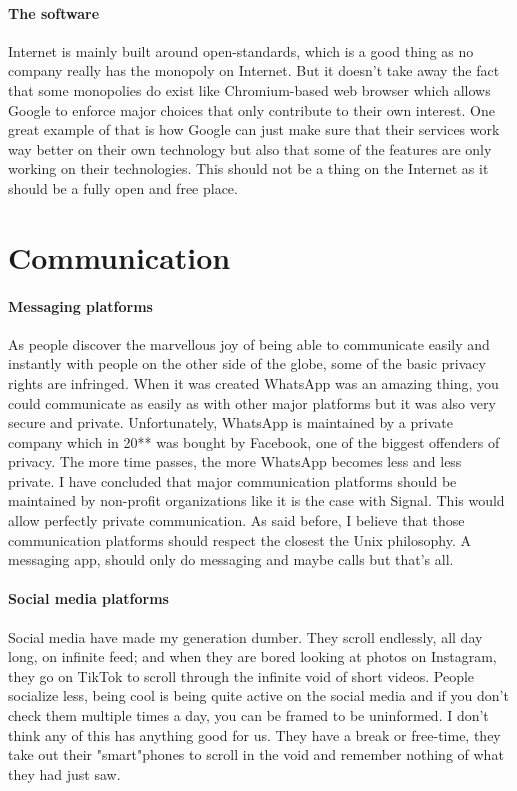 \documentclass[a4paper,10pt]{article}
\begin{document}
\paragraph{The software}

Internet is mainly built around open-standards, which is a good thing as no company really has the monopoly on Internet. But it doesn't take away the fact that some monopolies do exist like Chromium-based web browser which allows Google to enforce major choices that only contribute to their own interest. One great example of that is how Google can just make sure that their services work way better on their own technology but also that some of the features are only working on their technologies. This should not be a thing on the Internet as it should be a fully open and free place.

\pagebreak

\section{Communication}

\paragraph{Messaging platforms}

As people discover the marvellous joy of being able to communicate easily and instantly with people on the other side of the globe, some of the basic privacy rights are infringed. When it was created WhatsApp was an amazing thing, you could communicate as easily as with other major platforms but it was also very secure and private. Unfortunately, WhatsApp is maintained by a private company which in 20** was bought by Facebook, one of the biggest offenders of privacy. The more time passes, the more WhatsApp becomes less and less private. I have concluded that major communication platforms should be maintained by non-profit organizations like it is the case with Signal. This would allow perfectly private communication. As said before, I believe that those communication platforms should respect the closest the Unix philosophy. A messaging app, should only do messaging and maybe calls but that's all.

\paragraph{Social media platforms}

Social media have made my generation dumber. They scroll endlessly, all day long, on infinite feed; and when they are bored looking at photos on Instagram, they go on TikTok to scroll through the infinite void of short videos. People socialize less, being cool is being quite active on the social media and if you don't check them multiple times a day, you can be framed to be uninformed. I don't think any of this has anything good for us. They have a break or free-time, they take out their "smart"phones to scroll in the void and remember nothing of what they had just saw.
\end{document}
